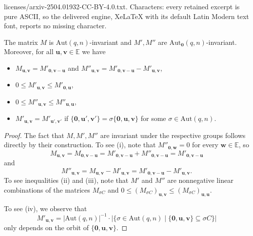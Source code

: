 \documentclass[10pt,a4paper]{amsart}
\newcommand{\AutZ}{\mathrm{Aut}_{\zero}}
\newcommand{\Aut}{\mathrm{Aut}}
\newcommand{\E}{\mathbb{E}}
\newcommand{\uu}{\mathbf{u}}
\newcommand{\vv}{\mathbf{v}}
\newcommand{\ww}{\mathbf{w}}
\newcommand{\zero}{\mathbf{0}}
\begin{document}
licenses/arxiv-2504.01932-CC-BY-4.0.txt. Characters: every retained excerpt is pure ASCII, so the delivered engine, XeLaTeX with its default Latin Modern text font, reports no missing character.
\begin{proposition}\label{prop:first}
The matrix $M$ is $\Aut(q,n)$-invariant and $M',M''$ are $\AutZ(q,n)$-invariant. Moreover, for all $\uu,\vv\in\E$ we have
\begin{itemize}
\item[\textup{(i)}] $M_{\uu,\vv}=M'_{\zero,\vv-\uu}$ \quad and \quad $M''_{\uu,\vv}=M'_{\zero,\vv-\uu}-M'_{\uu,\vv}$,
\item[\textup{(ii)}] $0 \leq M'_{\uu,\vv} \leq M'_{\zero,\uu}$,
\item[\textup{(iii)}] $0 \leq M''_{\uu,\vv} \leq M''_{\uu,\uu}$, 
\item[\textup{(iv)}] $M'_{\uu,\vv}=M'_{\uu',\vv'}$ if $\{\zero,\uu',\vv'\}=\sigma\{\zero,\uu,\vv\}$ for some $\sigma\in \Aut(q,n)$.
\end{itemize}
\end{proposition}

\begin{proof}
The fact that $M,M',M''$ are invariant under the respective groups follows directly by their construction. To see (i), note that $M''_{\zero,\ww}=0$ for every $\ww\in \E$, so 
\[
M_{\uu,\vv}=M_{\zero, \vv-\uu}=M'_{\zero,\vv-\uu}+M''_{\zero,\vv-\uu}=M'_{\zero,\vv-\uu}
\]
and 
\[
M''_{\uu,\vv}=M_{\uu,\vv}-M'_{\uu,\vv}=M'_{\zero,\vv-\uu}-M'_{\uu,\vv}.
\]
To see inequalities (ii) and (iii), note that $M'$ and $M''$ are nonnegative linear combinations of the matrices $M_{\sigma C}$ and $0\leq \left(M_{\sigma C}\right)_{\uu,\vv}\leq\left(M_{\sigma C}\right)_{\uu,\uu}$. 

To see (iv), we observe that
\[
M'_{\uu,\vv}=|\Aut(q,n)|^{-1}\cdot |\{\sigma\in \Aut(q,n)\mid \{\zero,\uu,\vv\}\subseteq \sigma C\}|
\]
only depends on the orbit of $\{\zero,\uu,\vv\}$.
\end{proof}
\end{document}
